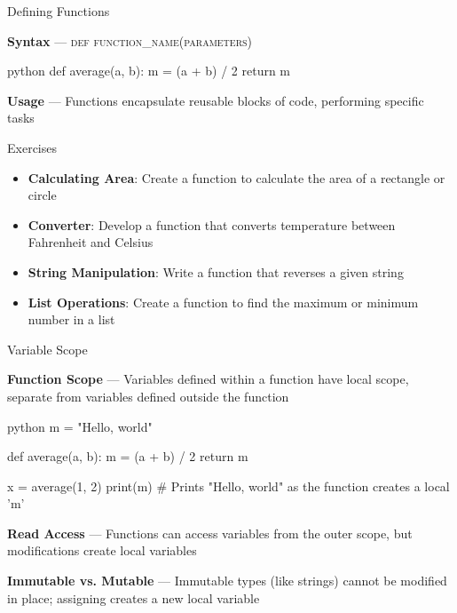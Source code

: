 \documentclass[
	11pt, 
]{beamer}
\begin{document}
\begin{frame}[fragile]{Defining Functions}

\textbf{Syntax} --- \textsc{def function\_name(parameters)}

\begin{mintedbox}{python}
    def average(a, b):
    m = (a + b) / 2
    return m
\end{mintedbox}

\textbf{Usage} --- Functions encapsulate reusable blocks of code, performing specific tasks

\begin{alertblock}{Exercises}
    \begin{itemize}   
        \item \textbf{Calculating Area}: Create a function to calculate the area of a rectangle or circle
        \item \textbf{Converter}: Develop a function that converts temperature between Fahrenheit and Celsius
        \item \textbf{String Manipulation}: Write a function that reverses a given string
        \item \textbf{List Operations}: Create a function to find the maximum or minimum number in a list    
    \end{itemize} 
\end{alertblock}

\end{frame}



\begin{frame}[fragile]{Variable Scope}

\textbf{Function Scope} --- Variables defined within a function have local scope, separate from variables defined outside the function

\begin{mintedbox}{python}
m = "Hello, world"

def average(a, b):
    m = (a + b) / 2
    return m

x = average(1, 2)
print(m) # Prints "Hello, world" as the function creates a local 'm'
\end{mintedbox}

\textbf{Read Access} --- Functions can access variables from the outer scope, but modifications create local variables

\vspace{.5cm}

\textbf{Immutable vs. Mutable} --- Immutable types (like strings) cannot be modified in place; assigning creates a new local variable

\end{frame}
\end{document}
